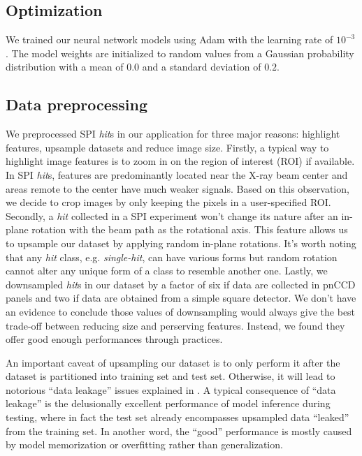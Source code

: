 \subsection{Optimization}

We trained our neural network models using Adam
\cite{kingmaAdamMethodStochastic2017} with the learning rate of $10^{-3}$.  The
model weights are initialized to random values from a Gaussian probability
distribution with a mean of $0.0$ and a standard deviation of $0.2$.  


\subsection{Data preprocessing}

We preprocessed SPI \textit{hit}s in our application for three major reasons:
highlight features, upsample datasets and reduce image size.  Firstly, a typical
way to highlight image features is to zoom in on the region of interest (ROI) if
available.  In SPI \textit{hit}s, features are predominantly located near the
X-ray beam center and areas remote to the center have much weaker signals.
Based on this observation, we decide to crop images by only keeping the pixels
in a user-specified ROI.  Secondly, a \textit{hit} collected in a SPI experiment
won't change its nature after an in-plane rotation with the beam path as the
rotational axis.  This feature allows us to upsample our dataset by applying
random in-plane rotations.  It's worth noting that any \textit{hit} class, e.g.
\textit{single-hit}, can have various forms but random rotation cannot alter any
unique form of a class to resemble another one.  Lastly, we downsampled
\textit{hit}s in our dataset by a factor of six if data are collected in pnCCD
panels and two if data are obtained from a simple square detector.  We don't
have an evidence to conclude those values of downsampling would always give the
best trade-off between reducing size and perserving features.  Instead, we found
they offer good enough performances through practices.  

An important caveat of upsampling our dataset is to only perform it after the
dataset is partitioned into training set and test set.  Otherwise, it will lead
to notorious ``data leakage'' issues explained in
\cite{kapoorLeakageReproducibilityCrisis2022}.  A typical consequence of ``data
leakage'' is the delusionally excellent performance of model inference during
testing, where in fact the test set already encompasses upsampled data
``leaked'' from the training set.  In another word, the ``good'' performance is
mostly caused by model memorization or overfitting rather than generalization.


